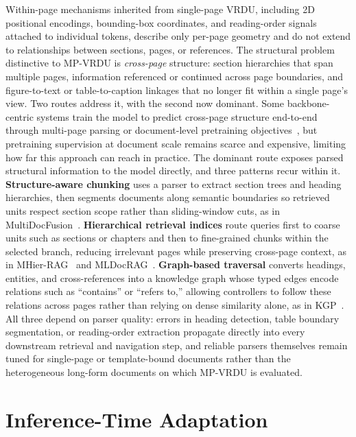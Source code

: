 \documentclass[11pt]{article}
\begin{document}
Within-page mechanisms inherited from single-page VRDU, including 2D positional encodings, bounding-box coordinates, and reading-order signals attached to individual tokens, describe only per-page geometry and do not extend to relationships between sections, pages, or references. The structural problem distinctive to MP-VRDU is \textit{cross-page} structure: section hierarchies that span multiple pages, information referenced or continued across page boundaries, and figure-to-text or table-to-caption linkages that no longer fit within a single page's view. Two routes address it, with the second now dominant. Some backbone-centric systems train the model to predict cross-page structure end-to-end through multi-page parsing or document-level pretraining objectives~\cite{hu2025mplugdocowl2,duan2025docopilot}, but pretraining supervision at document scale remains scarce and expensive, limiting how far this approach can reach in practice. The dominant route exposes parsed structural information to the model directly, and three patterns recur within it. \textbf{Structure-aware chunking} uses a parser to extract section trees and heading hierarchies, then segments documents along semantic boundaries so retrieved units respect section scope rather than sliding-window cuts, as in MultiDocFusion~\cite{shin2025multidocfusion}. \textbf{Hierarchical retrieval indices} route queries first to coarse units such as sections or chapters and then to fine-grained chunks within the selected branch, reducing irrelevant pages while preserving cross-page context, as in MHier-RAG~\cite{gong2025mhierrag} and MLDocRAG~\cite{zhang2026mldocrag}. \textbf{Graph-based traversal} converts headings, entities, and cross-references into a knowledge graph whose typed edges encode relations such as ``contains'' or ``refers to,'' allowing controllers to follow these relations across pages rather than relying on dense similarity alone, as in KGP~\cite{wang2024knowledge}. All three depend on parser quality: errors in heading detection, table boundary segmentation, or reading-order extraction propagate directly into every downstream retrieval and navigation step, and reliable parsers themselves remain tuned for single-page or template-bound documents rather than the heterogeneous long-form documents on which MP-VRDU is evaluated.

\section{Inference-Time Adaptation}
\label{sec:inference-time}
\end{document}
